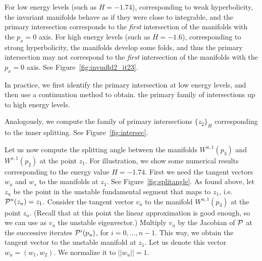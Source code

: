 \begin{remark}
For low energy levels (such as $H=-1.74$), corresponding to weak
hyperbolicity, the invariant manifolds behave as if they were close to
integrable, and the primary intersection corresponds to the
\emph{first} intersection of the manifolds with the $p_x=0$ axis.
For high energy levels (such as $H=-1.6$), corresponding to strong
hyperbolicity, the manifolds develop some folds, and thus the primary
intersection may not correspond to the \emph{first} intersection of
the manifolds with the $p_x=0$ axis. See
Figure~\ref{fig:invmfld2_it23}.

In practice, we first identify the primary intersection at low energy
levels, and then use a continuation method to obtain. the primary
family of intersections up to high energy levels.
\end{remark}

Analogously, we compute the family of primary intersections
$\{z_2\}_H$ corresponding to the inner splitting.
See Figure~\ref{fig:intersec}.

Let us now compute the splitting angle between the manifolds $W^{u,1}(p_3)$
and $W^{s,1}(p_2)$ at the point $z_1$.
For illustration, we show some numerical results corresponding
to the energy value $H=-1.74$.
First we need the tangent vectors $w_u$ and $w_s$ to the manifolds at
$z_1$. See Figure~\ref{fig:splitangle}.
As found above, let $z_u$ be the point in the unstable fundamental
segment that maps to $z_1$, i.e. $\mathcal{P}^{n}(z_u) = z_1$.
Consider the tangent vector $v_u$ to the manifold $W^{u,1}(p_3)$ at
the point $z_u$. 
(Recall that at this point the linear approximation is good enough, so
we can use as $v_u$ the unstable eigenvector.)
Multiply $v_u$ by the Jacobian of $\mathcal{P}$ at the successive iterates
$\mathcal{P}^{i}(p_u)$, for $i=0,...,n-1$.
This way, we obtain the tangent vector to the unstable manifold at
$z_1$. Let us denote this vector $w_u=(w_1,w_2)$.
We normalize it to $||w_u||=1$.

